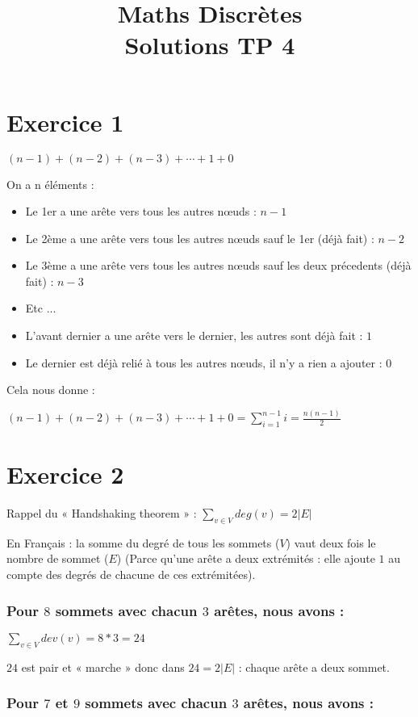 \documentclass[fontsize=10pt]{article}
\title{\textbf{Maths Discrètes}\\ Solutions TP 4}
\date{}
\begin{document}
\maketitle %


\section*{Exercice 1}
$(n-1) + (n-2) + (n-3) + \cdots + 1 + 0$

On a n éléments :
\begin{itemize}
    \itemsep0em
    \item Le 1er a une arête vers tous les autres nœuds : $n-1$
    \item Le 2ème a une arête vers tous les autres nœuds sauf le 1er (déjà fait) : $n-2$
    \item Le 3ème a une arête vers tous les autres nœuds sauf les deux précedents (déjà fait) : $n-3$
    \item Etc ...
    \item L'avant dernier a une arête vers le dernier, les autres sont déjà fait : $1$
    \item Le dernier est déjà relié à tous les autres nœuds, il n'y a rien a ajouter : $0$
\end{itemize}

Cela nous donne :

$(n-1) + (n-2) + (n-3) + \cdots + 1 + 0 = \displaystyle\sum_{i=1}^{n-1} i = \frac{n ( n - 1)}{2}$

\section*{Exercice 2}
Rappel du « Handshaking theorem » :
$ \displaystyle\sum_{v \in V} deg(v) = 2 |E|$

En Français : la somme du degré de tous les sommets ($V$) vaut deux fois le nombre de sommet ($E$) (Parce qu'une arête a deux extrémités : elle ajoute $1$ au compte des degrés de chacune de ces extrémitées).

\subsubsection*{Pour $8$ sommets avec chacun $3$ arêtes, nous avons :}
$\displaystyle\sum_{v \in V} dev(v) = 8 * 3 = 24$

$24$ est pair et « marche » donc dans $24 = 2 |E|$ : chaque arête a deux sommet.

\subsubsection*{Pour $7$ et $9$ sommets avec chacun $3$ arêtes, nous avons :}
\end{document}
